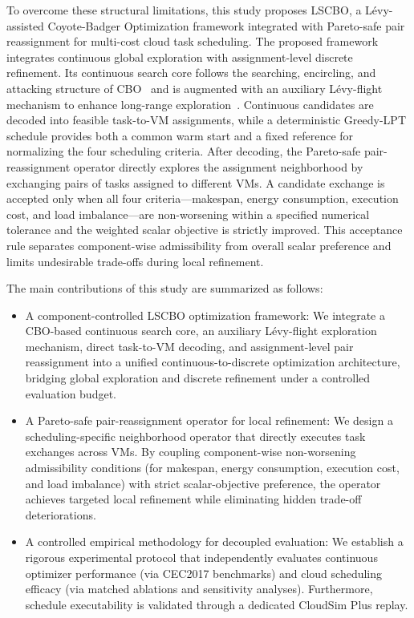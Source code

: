 \documentclass[pdflatex,onecolumn,sn-mathphys-num]{sn-jnl}
\begin{document}
To overcome these structural limitations, this study proposes LSCBO, a L\'{e}vy-assisted Coyote-Badger Optimization framework integrated with Pareto-safe pair reassignment for multi-cost cloud task scheduling. The proposed framework integrates continuous global exploration with assignment-level discrete refinement. Its continuous search core follows the searching, encircling, and attacking structure of CBO~\cite{Khatab2025} and is augmented with an auxiliary L\'{e}vy-flight mechanism to enhance long-range exploration~\cite{Mantegna1994}. Continuous candidates are decoded into feasible task-to-VM assignments, while a deterministic Greedy-LPT schedule provides both a common warm start and a fixed reference for normalizing the four scheduling criteria. After decoding, the Pareto-safe pair-reassignment operator directly explores the assignment neighborhood by exchanging pairs of tasks assigned to different VMs. A candidate exchange is accepted only when all four criteria---makespan, energy consumption, execution cost, and load imbalance---are non-worsening within a specified numerical tolerance and the weighted scalar objective is strictly improved. This acceptance rule separates component-wise admissibility from overall scalar preference and limits undesirable trade-offs during local refinement.

The main contributions of this study are summarized as follows:

\begin{itemize}
    \item A component-controlled LSCBO optimization framework: We integrate a CBO-based continuous search core, an auxiliary L\'{e}vy-flight exploration mechanism, direct task-to-VM decoding, and assignment-level pair reassignment into a unified continuous-to-discrete optimization architecture, bridging global exploration and discrete refinement under a controlled evaluation budget.

    \item A Pareto-safe pair-reassignment operator for local refinement: We design a scheduling-specific neighborhood operator that directly executes task exchanges across VMs. By coupling component-wise non-worsening admissibility conditions (for makespan, energy consumption, execution cost, and load imbalance) with strict scalar-objective preference, the operator achieves targeted local refinement while eliminating hidden trade-off deteriorations.

    \item A controlled empirical methodology for decoupled evaluation: We establish a rigorous experimental protocol that independently evaluates continuous optimizer performance (via CEC2017 benchmarks) and cloud scheduling efficacy (via matched ablations and sensitivity analyses). Furthermore, schedule executability is validated through a dedicated CloudSim Plus replay.

\end{itemize}
\end{document}
